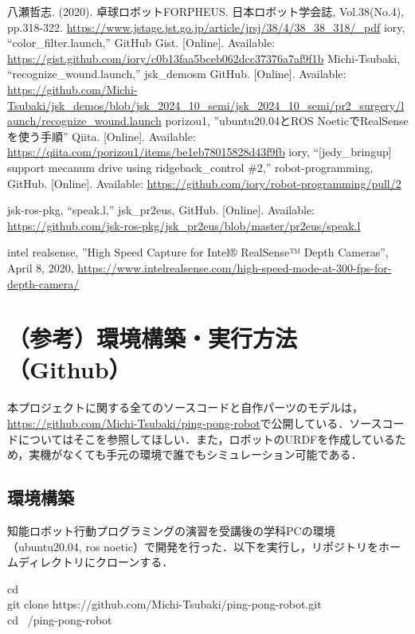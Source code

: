 \documentclass[10pt, oneside, titlepage]{ltjarticle}  %
\begin{document}
\begin{thebibliography}{7}
  八瀬哲志. (2020). 卓球ロボットFORPHEUS. 日本ロボット学会誌, Vol.38(No.4), pp.318-322. \url{https://www.jstage.jst.go.jp/article/jrsj/38/4/38_38_318/_pdf}
  iory, ``color\_filter.launch,'' GitHub Gist. [Online]. Available: 
  \url{https://gist.github.com/iory/c0b13faa5bceb062dcc37376a7af9f1b}
  Michi-Tsubaki, ``recognize\_wound.launch,'' jsk\_demosm GitHub. [Online]. Available: 
  \url{https://github.com/Michi-Tsubaki/jsk_demos/blob/jsk_2024_10_semi/jsk_2024_10_semi/pr2_surgery/launch/recognize_wound.launch}
  porizou1, ''ubuntu20.04とROS NoeticでRealSenseを使う手順'' Qiita. [Online]. Available: 
  \url{https://qiita.com/porizou1/items/be1eb78015828d43f9fb}
  iory, ``[jedy\_bringup] support mecanum drive using ridgeback\_control \#2,'' robot-programming, GitHub. [Online]. Available: 
  \url{https://github.com/iory/robot-programming/pull/2}

  jsk-ros-pkg, ``speak.l,'' jsk\_pr2eus, GitHub. [Online]. Available: 
  \url{https://github.com/jsk-ros-pkg/jsk_pr2eus/blob/master/pr2eus/speak.l}

  intel realsense, ''High Speed Capture for Intel® RealSense™ Depth Cameras'', April 8, 2020,
  \url{https://www.intelrealsense.com/high-speed-mode-at-300-fps-for-depth-camera/}
\end{thebibliography}

\dotfill

\section{（参考）環境構築・実行方法（Github）}
  本プロジェクトに関する全てのソースコードと自作パーツのモデルは， \url{https://github.com/Michi-Tsubaki/ping-pong-robot}で公開している．ソースコードについてはそこを参照してほしい．また，ロボットのURDFを作成しているため，実機がなくても手元の環境で誰でもシミュレーション可能である．
  \subsection{環境構築}
  知能ロボット行動プログラミングの演習を受講後の学科PCの環境（ubuntu20.04, ros noetic）で開発を行った．以下を実行し，リポジトリをホームディレクトリにクローンする．
  \begin{screen}
    cd ~ \\
    git clone https://github.com/Michi-Tsubaki/ping-pong-robot.git \\
    cd ~/ping-pong-robot
  \end{screen}
\end{document}
